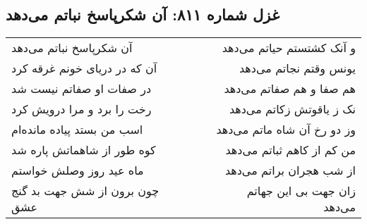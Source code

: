 \begin{center}
\section*{غزل شماره ۸۱۱: آن شکرپاسخ نباتم می‌دهد}
\label{sec:0811}
\begin{longtable}{l p{0.5cm} r}
آن شکرپاسخ نباتم می‌دهد
&&
و آنک کشتستم حیاتم می‌دهد
\\
آن که در دریای خونم غرقه کرد
&&
یونس وقتم نجاتم می‌دهد
\\
در صفات او صفاتم نیست شد
&&
هم صفا و هم صفاتم می‌دهد
\\
رخت را برد و مرا درویش کرد
&&
نک ز یاقوتش زکاتم می‌دهد
\\
اسب من بستد پیاده مانده‌ام
&&
وز دو رخ آن شاه ماتم می‌دهد
\\
کوه طور از شاهماتش پاره شد
&&
من کم از کاهم ثباتم می‌دهد
\\
ماه عید روز وصلش خواستم
&&
از شب هجران براتم می‌دهد
\\
چون برون از شش جهت بد گنج عشق
&&
زان جهت بی این جهاتم می‌دهد
\\
\end{longtable}
\end{center}
